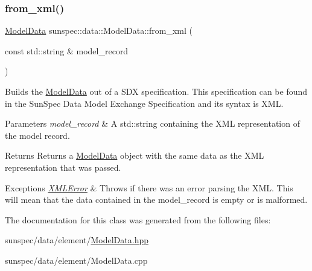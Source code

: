 \subsubsection{\texorpdfstring{from\+\_\+xml()}{from\_xml()}\hspace{0.1cm}{\footnotesize\ttfamily [2/2]}}
{\footnotesize\ttfamily \hyperlink{structsunspec_1_1data_1_1_model_data}{Model\+Data} sunspec\+::data\+::\+Model\+Data\+::from\+\_\+xml (\begin{DoxyParamCaption}\item[{const std\+::string \&}]{model\+\_\+record }\end{DoxyParamCaption})\hspace{0.3cm}{\ttfamily [static]}}

Builds the \hyperlink{structsunspec_1_1data_1_1_model_data}{Model\+Data} out of a S\+DX specification. This specification can be found in the Sun\+Spec Data Model Exchange Specification and its syntax is X\+ML. 
\begin{DoxyParams}{Parameters}
{\em model\+\_\+record} & A {\ttfamily std\+::string} containing the X\+ML representation of the model record. \\
\hline
\end{DoxyParams}
\begin{DoxyReturn}{Returns}
Returns a {\ttfamily \hyperlink{structsunspec_1_1data_1_1_model_data}{Model\+Data}} object with the same data as the X\+ML representation that was passed. 
\end{DoxyReturn}

\begin{DoxyExceptions}{Exceptions}
{\em \hyperlink{classsunspec_1_1data_1_1_x_m_l_error}{X\+M\+L\+Error}} & Throws if there was an error parsing the X\+ML. This will mean that the data contained in the {\ttfamily model\+\_\+record} is empty or is malformed. \\
\hline
\end{DoxyExceptions}


The documentation for this class was generated from the following files\+:\begin{DoxyCompactItemize}
\item 
sunspec/data/element/\hyperlink{_model_data_8hpp}{Model\+Data.\+hpp}\item 
sunspec/data/element/Model\+Data.\+cpp\end{DoxyCompactItemize}
